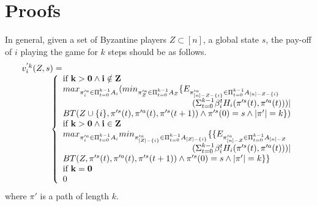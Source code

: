 
\renewcommand{\thesection}{\Alph{section}}%

\section{Proofs}\label{apdx}

\setcounter{theorem}{0}
\setcounter{proposition}{0}
\setcounter{lemma}{0}

In general, given a set of Byzantine players $Z \subset [n]$, a global state $s$, 
the pay-off of $i$ playing the game for $k$ steps should be as follows.
\[
\begin{array}{l}
v_i^{'k}(Z,s)=\\
\hspace{1.2cm} \left\{
\begin{array}{l}
{\bf \text{if } k > 0 \wedge i \notin Z}  \\
max_{\pi'^{a}_{i} \in \Pi_{t=0}^{k-1} A_{i}}
(min_{\pi'^{a}_{Z} \in \Pi_{t=0}^{k-1} A_{Z}}
\{E_{\pi'^{a}_{[n]-Z-\{i\}} \in \Pi_{t=0}^{k-1} A_{[n]-Z-\{i\}}}\\ \hfill
(\Sigma_{t=0}^{k-1} \beta_i^{t}H_{i}(\pi'^{s}(t),\pi'^{a}(t))) |\\ BT(Z\cup\{i\},\pi'^{s}(t),\pi'^{a}(t),\pi'^{s}(t+1)) \wedge \pi'^{s}(0)=s \wedge |\pi'|=k\})\\
{\bf \text{if } k > 0 \wedge i \in Z} \\
max_{\pi'^{a}_{i} \in \Pi_{t=0}^{k-1} A_{i}}
min_{\pi'^{a}_{[Z]-\{i\}} \in \Pi_{t=0}^{k-1} A_{[Z]-\{i\}}}
\{\{E_{\pi'^{a}_{[n]-Z} \in \Pi_{t=0}^{k-1} A_{[n]-Z}}\\ \hfill(\Sigma_{t=0}^{k-1} \beta_i^{t}H_{i}(\pi'^{s}(t),\pi'^{a}(t))) |\\ BT(Z,\pi'^{s}(t),\pi'^{a}(t),\pi'^{s}(t+1)) \wedge \pi'^{s}(0)=s \wedge |\pi'|=k\}\}\\
{\bf \text{if } k = 0}  \\0
\end{array}
\right.
\end{array}
\]
where $\pi'$ is a path of length $k$.

